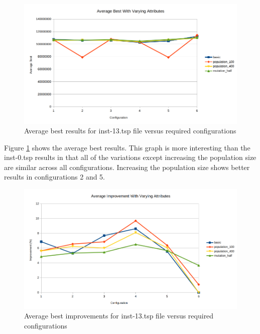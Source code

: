 \begin{figure}[H]
\vspace{-5pt}
\centering
\includegraphics[width=1.0\textwidth]{images/inst-13-average-best.png}
\caption{\label{fig:inst-13-average-best}Average best results for inst-13.tsp file versus required configurations}
\end{figure}

Figure \ref{fig:inst-13-average-best} shows the average best results. This graph is more interesting than the inst-0.tsp results in that all of the variations except increasing the population size are similar across all configurations. Increasing the population size shows better results in configurations 2 and 5. 

\begin{figure}[H]
\vspace{-5pt}
\centering
\includegraphics[width=1.0\textwidth]{images/inst-13-best-improvements.png}
\caption{\label{fig:inst-13-best-improvements}Average best improvements for inst-13.tsp file versus required configurations}
\end{figure}



